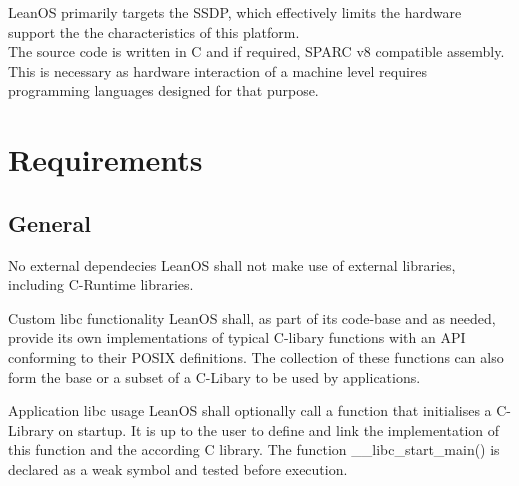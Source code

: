 LeanOS primarily targets the \gls{SSDP}, which effectively limits the hardware
support the the characteristics of this platform. \\
\noindent
The source code is written in C and if required, \gls{SPARC} v8 compatible
assembly. This is necessary as hardware interaction of a machine level requires
programming languages designed for that purpose.



\chapter{Requirements}

\section{General}


 {No external dependecies}{%
LeanOS shall not make use of external libraries, including C-Runtime libraries.
}{}%

 {Custom libc functionality}{%
LeanOS shall, as part of its code-base and as needed, provide its own
implementations of typical C-libary functions with an \gls{API} conforming to
their \gls{POSIX} definitions.
}{%
The collection of these functions can also form the base or a subset of a
C-Libary to be used by applications.}%

 {Application libc usage}{%
LeanOS shall optionally call a function that initialises a C-Library on startup.
It is up to the user to define and link the implementation of this function and
the according C library.
}{%
The function \_\_libc\_start\_main() is declared as a weak symbol and tested
before execution.
}%


%
%
%
%

